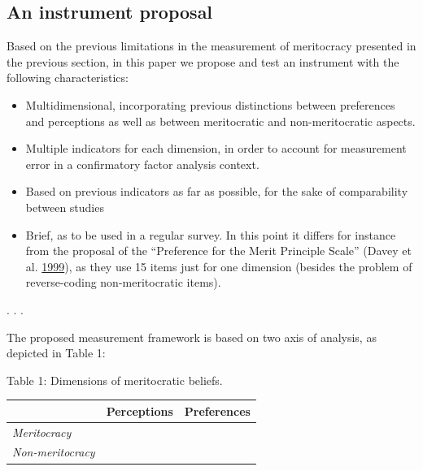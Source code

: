 \documentclass[
]{article}
\providecommand{\tightlist}{%
  \setlength{\itemsep}{0pt}\setlength{\parskip}{0pt}}
\begin{document}
\hypertarget{an-instrument-proposal}{%
\subsection{An instrument proposal}\label{an-instrument-proposal}}

Based on the previous limitations in the measurement of meritocracy
presented in the previous section, in this paper we propose and test an
instrument with the following characteristics:

\begin{itemize}
\tightlist
\item
  Multidimensional, incorporating previous distinctions between
  preferences and perceptions as well as between meritocratic and
  non-meritocratic aspects.
\item
  Multiple indicators for each dimension, in order to account for
  measurement error in a confirmatory factor analysis context.
\item
  Based on previous indicators as far as possible, for the sake of
  comparability between studies
\item
  Brief, as to be used in a regular survey. In this point it differs for
  instance from the proposal of the ``Preference for the Merit Principle
  Scale'' (Davey et al.
  \protect\hyperlink{ref-davey_preference_1999}{1999}), as they use 15
  items just for one dimension (besides the problem of reverse-coding
  non-meritocratic items).
\end{itemize}

. . .

The proposed measurement framework is based on two axis of analysis, as
depicted in Table 1:

Table 1: Dimensions of meritocratic beliefs.

\begin{longtable}[]{@{}lll@{}}
\toprule
& Perceptions & Preferences\tabularnewline
\midrule
\endhead
\emph{Meritocracy} & &\tabularnewline
\emph{Non-meritocracy} & &\tabularnewline
\bottomrule
\end{longtable}
\end{document}

